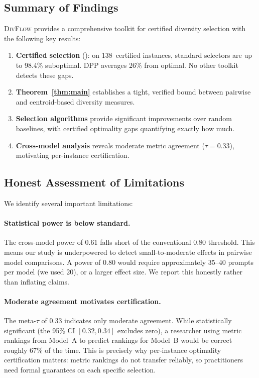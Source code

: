 \documentclass[11pt,a4paper]{article}
\newcommand{\divflow}{\textsc{DivFlow}}
\begin{document}
\subsection{Summary of Findings}

\divflow{} provides a comprehensive toolkit for certified
diversity selection with the following key results:

\begin{enumerate}[leftmargin=2em,itemsep=2pt]
\item \textbf{Certified selection} ():
      on 138~certified instances, standard selectors are
      up to 98.4\% suboptimal.  DPP averages 26\% from
      optimal.  No other toolkit detects these gaps.
\item \textbf{Theorem~\ref{thm:main}} establishes a tight,
      verified bound between pairwise and centroid-based
      diversity measures.
\item \textbf{Selection algorithms} provide significant
      improvements over random baselines, with certified
      optimality gaps quantifying exactly how much.
\item \textbf{Cross-model analysis} reveals moderate
      metric agreement ($\tau = 0.33$), motivating
      per-instance certification.
\end{enumerate}

\subsection{Honest Assessment of Limitations}

We identify several important limitations:

\paragraph{Statistical power is below standard.}
The cross-model power of 0.61 falls short of the
conventional 0.80 threshold.  This means our study
is underpowered to detect small-to-moderate effects
in pairwise model comparisons.  A power of 0.80
would require approximately 35--40 prompts per model
(we used 20), or a larger effect size.  We report
this honestly rather than inflating claims.

\paragraph{Moderate agreement motivates certification.}
The meta-$\tau$ of 0.33 indicates only moderate
agreement.  While statistically significant (the
95\% CI $[0.32, 0.34]$ excludes zero), a researcher
using metric rankings from Model~A to predict rankings
for Model~B would be correct roughly 67\% of the time.
This is precisely why per-instance optimality
certification matters: metric rankings do not transfer
reliably, so practitioners need formal guarantees on
each specific selection.
\end{document}
